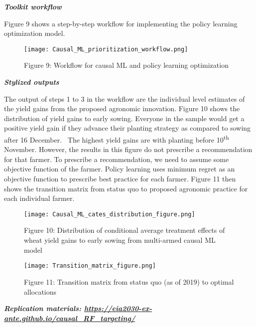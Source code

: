 \documentclass[
  letterpaper,
  DIV=11,
  numbers=noendperiod]{scrreprt}
\begin{document}
\textbf{\emph{Toolkit workflow}}

Figure 9 shows a step-by-step workflow for implementing the policy
learning optimization model.

\begin{figure}[H]

{\centering \texttt{[image: Causal\_ML\_prioritization\_workflow.png]}

}

\caption{Figure 9: Workflow for causal ML and policy learning
optimization}

\end{figure}%

\textbf{\emph{Stylized outputs}}

The output of steps 1 to 3 in the workflow are the individual level
estimates of the yield gains from the proposed agronomic innovation.
Figure 10 shows the distribution of yield gains to early sowing.
Everyone in the sample would get a positive yield gain if they advance
their planting strategy as compared to sowing after 16 December.~ The
highest yield gains are with planting before 10\textsuperscript{th}
November. However, the results in this figure do not prescribe a
recommendation for that farmer. To prescribe a recommendation, we need
to assume some objective function of the farmer. Policy learning uses
minimum regret as an objective function to prescribe best practice for
each farmer. Figure 11 then shows the transition matrix from status quo
to proposed agronomic practice for each individual farmer.

\begin{figure}[H]

{\centering \texttt{[image: Causal\_ML\_cates\_distribution\_figure.png]}

}

\caption{Figure 10: Distribution of conditional average treatment
effects of wheat yield gains to early sowing from multi-armed causal ML
model}

\end{figure}%
\begin{figure}[H]

{\centering \texttt{[image: Transition\_matrix\_figure.png]}

}

\caption{Figure 11: Transition matrix from status quo (as of 2019) to
optimal allocations}

\end{figure}%

\textbf{\emph{Replication materials:
\url{https://eia2030-ex-ante.github.io/causal_RF_targeting/}}}
\end{document}
